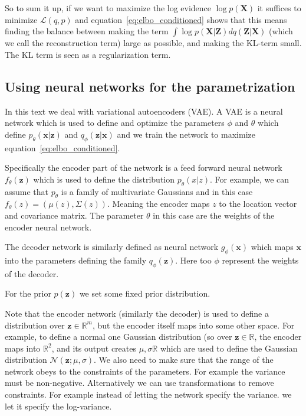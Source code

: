 \documentclass[11pt, a4paper]{report}
\theoremstyle{plain}
\theoremstyle{definition}
\theoremstyle{remark}
\newcommand{\R}{\mathbb{R}}
\newcommand{\X}{\mathbf{X}}
\newcommand{\x}{\mathbf{x}}
\newcommand{\Z}{\mathbf{Z}}
\newcommand{\z}{\mathbf{z}}
\begin{document}
So to sum it up, if we want to maximize the log evidence $\log p(\X)$ it
suffices to minimize $\mathcal{L}(q,p)$ and equation~\ref{eq:elbo_conditioned}
shows that this means finding the balance between making 
the term $\int \log p(\X | \Z)dq(\Z|\X)$ (which we call the reconstruction term) large as possible, 
and making the KL-term small.
The KL term is seen as a regularization term.

\subsection{Using neural networks for the parametrization}
In this text we deal with variational autoencoders (VAE).
A VAE is a neural network which is used to define and optimize the parameters
$\phi$ and $\theta$ which define $p_{\theta}(\x | \z)$ and $q_{\phi}(\z | \x)$
and we train the network to maximize equation~\ref{eq:elbo_conditioned}.

Specifically the encoder part of the network is a feed forward neural network 
$f_{\theta}(\z)$ which is
used to define the distribution $p_{\theta}(x|z)$. For example, we can assume that $p_{\theta}$
is a family of multivariate Gaussians and in this case $f_{\theta}(z) =
(\mu(z), \Sigma(z))$. Meaning the encoder maps $z$ to the location vector and
covariance matrix. The parameter $\theta$ in this case are the weights of the
encoder neural network. 

The decoder network is similarly defined as neural network $g_{\phi}(\x)$ which
maps $\x$ into the parameters defining the family $q_{\phi}(\z)$. Here too $\phi$
represent the weights of the decoder.

For the prior $p(\z)$ we set some fixed prior distribution.

Note that the encoder network (similarly the decoder) is used to define a distribution over
$\z \in \R^m$, but the encoder itself maps into some other space. 
For example,
to define a normal one Gaussian distribution (so over $\z \in \R$, the encoder
maps into $\R^2$, and its output creates $\mu, \sigma \R$ which are used to
define the Gaussian distribution $\mathcal{N}(\z ; \mu, \sigma)$.
We also need to make sure that the range of the network obeys to the constraints
of the parameters. For example the variance must be non-negative. 
Alternatively we can use transformations to remove constraints. For example
instead of letting the network specify the variance. we let it specify the
log-variance.
\end{document}
